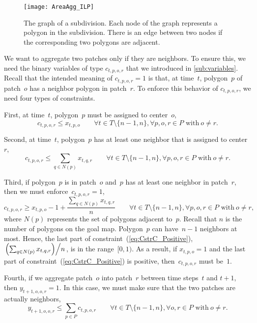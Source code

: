 \begin{figure}[tb]
	\centering
	\texttt{[image: AreaAgg\_ILP]}
	\caption{The graph of a subdivision.
		Each node of the graph represents a polygon in the 
		subdivision.
		There is an edge between two nodes
		if the corresponding two polygons are adjacent.
	}
	\label{fig:AreaAgg_Variables_Graph}
\end{figure} 

We want to aggregate two patches only if they are neighbors.
To ensure this, we need the binary variables of type $c_{t,p,o,r}$
that we introduced in \sect\ref{sub:variables}.
Recall that the intended meaning of $c_{t,p,o,r}=1$ is that, at time~$t$, 
polygon~$p$ of patch~$o$ has a neighbor polygon in patch~$r$.
To enforce this behavior of $c_{t,p,o,r}$, we need four types of
constraints.

First, at time~$t$, polygon~$p$ must be assigned to center~$o$,
\begin{equation}
\label{eq:CstrC_Part}
c_{t,p,o,r} \le x_{t,p,o} \qquad
\forall t 	 \in T\setminus \{n-1,n\},  
\forall p, o, r \in P \text{~with}~o\ne r.
\end{equation}

Second, at time~$t$, polygon~$p$ has at least 
one neighbor that is assigned to center~$r$,
\begin{equation}
\label{eq:CstrC_Neighbor}
c_{t,p,o,r} \le \sum_{q\in N(p)} x_{t,q,r} \qquad
\forall t 	 \in T\setminus \{n-1,n\},  
\forall p, o, r \in P \text{~with}~o\ne r.
\end{equation}

Third, if polygon~$p$ is in patch~$o$ and~$p$ has at least 
one neighbor in patch~$r$, then we must enforce~$c_{t,p,o,r}=1$,
\begin{equation}
\label{eq:CstrC_Positive}
c_{t,p,o,r} \ge x_{t,p,o} -1 +
\frac{\sum_{q\in N(p)} x_{t,q,r}}{n} \qquad
\forall t 	 \in T\setminus \{n-1,n\},  
\forall p, o, r \in P \text{~with}~o\ne r,
\end{equation}
where $N(p)$ represents the set of polygons adjacent to~$p$.
Recall that $n$ is the number of polygons on the goal map.
Polygon~$p$ can have~$n-1$ neighbors at most.
Hence, the last part of constraint~(\ref{eq:CstrC_Positive}),
$\left. \left(\sum_{q\in N(p)} x_{t,q,r}\right) 
\middle/ n \right.$,
is in the range~$[0,1)$.
As a result, if $x_{t,p,o}=1$ and the last part of 
constraint~(\ref{eq:CstrC_Positive}) is positive, 
then~$c_{t,p,o,r}$ must be~$1$.

Fourth, if we aggregate patch~$o$ into patch~$r$
between time steps~$t$ and $t+1$, 
then $y_{t+1,o,o,r}=1$.
In this case, we must make sure that 
the two patches are actually neighbors,
\begin{equation}
\label{eq:CstrC_Agg}
y_{t+1,o,o,r} \le \sum_{p\in P} c_{t,p,o,r} \qquad
\forall t 	 \in T\setminus \{n-1,n\},  
\forall o, r \in P \text{~with}~o\ne r.
\end{equation}


